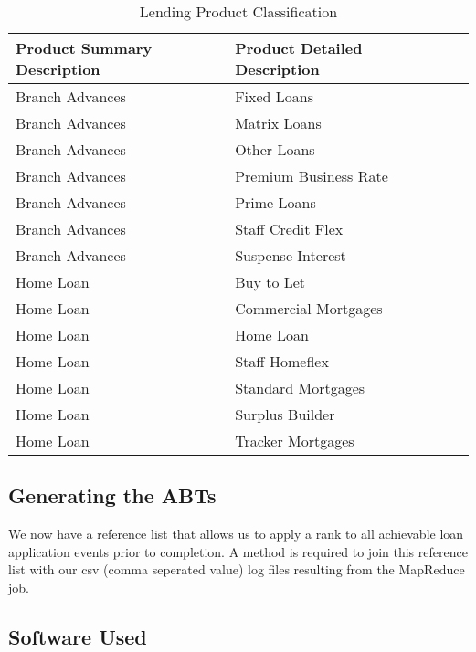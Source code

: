 \begin{table}[H]
	\centering
	\label{my-label}
	\resizebox{\textwidth}{!}
	{
	\begin{tabular}{|l|l|l|l|}
		\hline
		\textbf{Product Summary Description} & \textbf{Product Detailed Description} \\ \hline
		Branch Advances     & Fixed Loans \\ \hline
		Branch Advances     & Matrix Loans \\ \hline
		Branch Advances     & Other Loans \\ \hline
		Branch Advances     & Premium Business Rate \\ \hline
		Branch Advances     & Prime Loans \\ \hline
		Branch Advances     & Staff Credit Flex \\ \hline
		Branch Advances		& Suspense Interest \\ \hline
		Home Loan           & Buy to Let \\ \hline
		Home Loan           & Commercial Mortgages \\ \hline
		Home Loan           & Home Loan \\ \hline
		Home Loan           & Staff Homeflex \\ \hline
		Home Loan           & Standard Mortgages \\ \hline	
		Home Loan           & Surplus Builder \\ \hline		
		Home Loan           & Tracker Mortgages \\ \hline		
	\end{tabular}
	}
	\caption{Lending 
		Product Classification }
\end{table}

\subsection{Generating the ABTs}
We now have a reference list that allows us to apply a rank to all achievable loan application events prior to completion. A method is required to join this reference list with our csv (comma seperated value) log files resulting from the MapReduce job. 

\subsection{Software Used}\label{softwareUsed}

